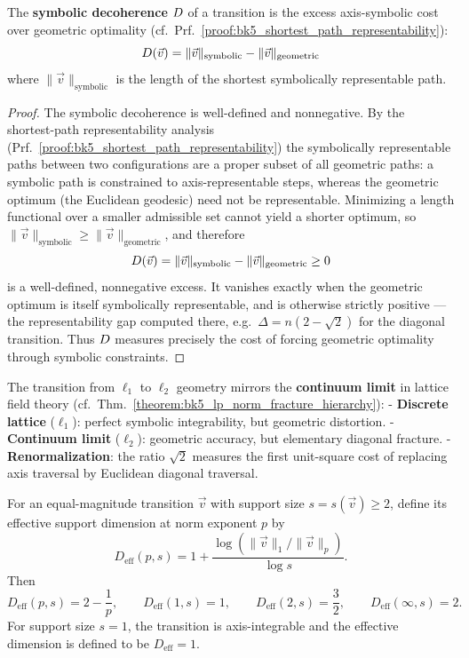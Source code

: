 \begin{corollary}
\label{corollary:bk5_symbolic_decoherence_theory}
The \textbf{symbolic decoherence} $D$ of a transition is the excess
axis-symbolic cost over geometric optimality (cf.~Prf.~\ref{proof:bk5_shortest_path_representability}):
$$D(\vec{v}) = \|\vec{v}\|_{\text{symbolic}} - \|\vec{v}\|_{\text{geometric}}$$
where $\|\vec{v}\|_{\text{symbolic}}$ is the length of the shortest symbolically representable path.
\end{corollary}
\begin{proof}
\label{proof:bk5_symbolic_decoherence_theory}
\leavevmode
The symbolic decoherence is well-defined and nonnegative. By the shortest-path representability analysis (Prf.~\ref{proof:bk5_shortest_path_representability}) the symbolically representable paths between two configurations are a proper subset of all geometric paths: a symbolic path is constrained to axis-representable steps, whereas the geometric optimum (the Euclidean geodesic) need not be representable. Minimizing a length functional over a smaller admissible set cannot yield a shorter optimum, so $\|\vec v\|_{\text{symbolic}}\ge\|\vec v\|_{\text{geometric}}$, and therefore
\[
D(\vec v)=\|\vec v\|_{\text{symbolic}}-\|\vec v\|_{\text{geometric}}\ge 0
\]
is a well-defined, nonnegative excess. It vanishes exactly when the geometric optimum is itself symbolically representable, and is otherwise strictly positive --- the representability gap computed there, e.g.\ $\Delta=n(2-\sqrt2)$ for the diagonal transition. Thus $D$ measures precisely the cost of forcing geometric optimality through symbolic constraints.
\end{proof}

\begin{remark}
\label{remark:bk5_lattice_field_theory_analogy}
The transition from $\ell_1$ to $\ell_2$ geometry mirrors the \textbf{continuum limit} in lattice field theory (cf.~Thm.~\ref{theorem:bk5_lp_norm_fracture_hierarchy}):
- \textbf{Discrete lattice} ($\ell_1$): perfect symbolic integrability, but geometric distortion.
- \textbf{Continuum limit} ($\ell_2$): geometric accuracy, but elementary diagonal fracture.
- \textbf{Renormalization}: the ratio $\sqrt{2}$ measures the first unit-square cost of replacing axis traversal by Euclidean diagonal traversal.
\end{remark}

\begin{proposition}
\label{proposition:bk5_fractal_dimension_connection}
For an equal-magnitude transition $\vec{v}$ with support size
$s=s(\vec{v})\geq2$, define its effective support dimension at norm exponent
$p$ by
\[
D_{\mathrm{eff}}(p,s)
=1+\frac{\log\left(\|\vec{v}\|_1/\|\vec{v}\|_p\right)}{\log s}.
\]
Then
\[
D_{\mathrm{eff}}(p,s)=2-\frac{1}{p},\qquad
D_{\mathrm{eff}}(1,s)=1,\qquad
D_{\mathrm{eff}}(2,s)=\frac32,\qquad
D_{\mathrm{eff}}(\infty,s)=2.
\]
For support size $s=1$, the transition is axis-integrable and the effective
dimension is defined to be $D_{\mathrm{eff}}=1$.
\end{proposition}

